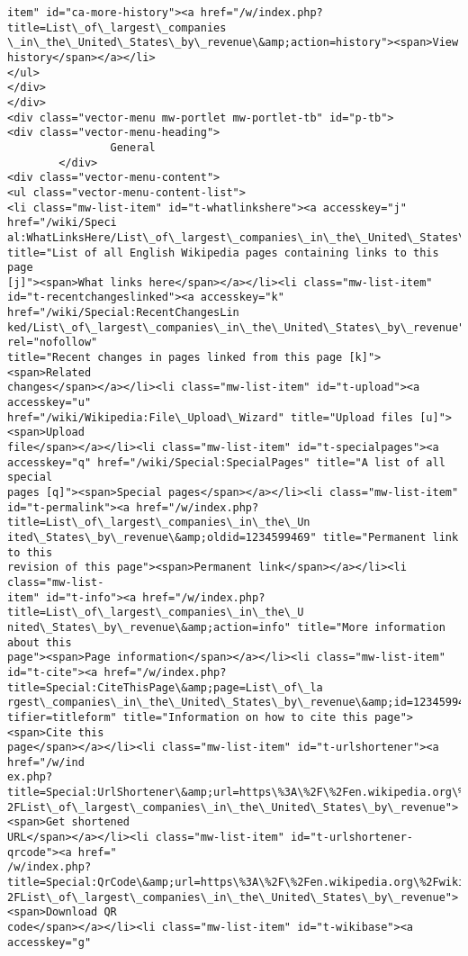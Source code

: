 \documentclass[11pt]{article}
\begin{document}
\begin{Verbatim}[commandchars=\\\{\}]
item" id="ca-more-history"><a href="/w/index.php?title=List\_of\_largest\_companies
\_in\_the\_United\_States\_by\_revenue\&amp;action=history"><span>View
history</span></a></li>
</ul>
</div>
</div>
<div class="vector-menu mw-portlet mw-portlet-tb" id="p-tb">
<div class="vector-menu-heading">
                General
        </div>
<div class="vector-menu-content">
<ul class="vector-menu-content-list">
<li class="mw-list-item" id="t-whatlinkshere"><a accesskey="j" href="/wiki/Speci
al:WhatLinksHere/List\_of\_largest\_companies\_in\_the\_United\_States\_by\_revenue"
title="List of all English Wikipedia pages containing links to this page
[j]"><span>What links here</span></a></li><li class="mw-list-item"
id="t-recentchangeslinked"><a accesskey="k" href="/wiki/Special:RecentChangesLin
ked/List\_of\_largest\_companies\_in\_the\_United\_States\_by\_revenue" rel="nofollow"
title="Recent changes in pages linked from this page [k]"><span>Related
changes</span></a></li><li class="mw-list-item" id="t-upload"><a accesskey="u"
href="/wiki/Wikipedia:File\_Upload\_Wizard" title="Upload files [u]"><span>Upload
file</span></a></li><li class="mw-list-item" id="t-specialpages"><a
accesskey="q" href="/wiki/Special:SpecialPages" title="A list of all special
pages [q]"><span>Special pages</span></a></li><li class="mw-list-item"
id="t-permalink"><a href="/w/index.php?title=List\_of\_largest\_companies\_in\_the\_Un
ited\_States\_by\_revenue\&amp;oldid=1234599469" title="Permanent link to this
revision of this page"><span>Permanent link</span></a></li><li class="mw-list-
item" id="t-info"><a href="/w/index.php?title=List\_of\_largest\_companies\_in\_the\_U
nited\_States\_by\_revenue\&amp;action=info" title="More information about this
page"><span>Page information</span></a></li><li class="mw-list-item"
id="t-cite"><a href="/w/index.php?title=Special:CiteThisPage\&amp;page=List\_of\_la
rgest\_companies\_in\_the\_United\_States\_by\_revenue\&amp;id=1234599469\&amp;wpFormIden
tifier=titleform" title="Information on how to cite this page"><span>Cite this
page</span></a></li><li class="mw-list-item" id="t-urlshortener"><a href="/w/ind
ex.php?title=Special:UrlShortener\&amp;url=https\%3A\%2F\%2Fen.wikipedia.org\%2Fwiki\%
2FList\_of\_largest\_companies\_in\_the\_United\_States\_by\_revenue"><span>Get shortened
URL</span></a></li><li class="mw-list-item" id="t-urlshortener-qrcode"><a href="
/w/index.php?title=Special:QrCode\&amp;url=https\%3A\%2F\%2Fen.wikipedia.org\%2Fwiki\%
2FList\_of\_largest\_companies\_in\_the\_United\_States\_by\_revenue"><span>Download QR
code</span></a></li><li class="mw-list-item" id="t-wikibase"><a accesskey="g"

\end{Verbatim}
\end{document}
